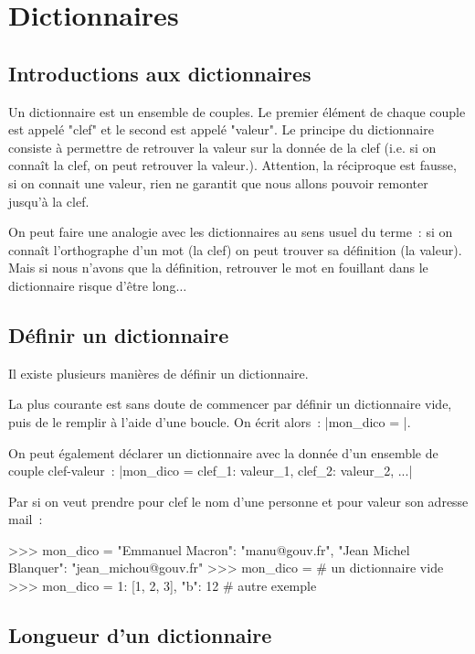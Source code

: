 \section{Dictionnaires}
	
	\subsection{Introductions aux dictionnaires}
		
		Un dictionnaire est un ensemble de couples. Le premier élément de chaque couple est appelé "clef" et le second est appelé "valeur".
		Le principe du dictionnaire consiste à permettre de retrouver la valeur sur la donnée de la clef (i.e. si on connaît la clef, on peut retrouver la valeur.). Attention, la réciproque est fausse, si on connait une valeur, rien ne garantit que nous allons pouvoir remonter jusqu'à la clef.
		
		On peut faire une analogie avec les dictionnaires au sens usuel du terme~: si on connaît l'orthographe d'un mot (la clef) on peut trouver sa définition (la valeur).
		Mais si nous n'avons que la définition, retrouver le mot en fouillant dans le dictionnaire risque d'être long$\ldots$
		
	\subsection{Définir un dictionnaire}
		
		Il existe plusieurs manières de définir un dictionnaire.
		
		La plus courante est sans doute de commencer par définir un dictionnaire vide, puis de le remplir à l'aide d'une boucle. On écrit alors~: \python|mon_dico = {}|.
		
		On peut également déclarer un dictionnaire avec la donnée d'un ensemble de couple clef-valeur~: \python|mon_dico = {clef_1: valeur_1, clef_2: valeur_2, ...}|
		
		Par si on veut prendre pour clef le nom d'une personne et pour valeur son adresse mail~:
		\begin{pythoncode}
			>>> mon_dico = {"Emmanuel Macron": "manu@gouv.fr", "Jean Michel Blanquer": "jean_michou@gouv.fr"}
			>>> mon_dico = {} # un dictionnaire vide
			>>> mon_dico = {1: [1, 2, 3], "b": 12} # autre exemple
		\end{pythoncode}
	
	\subsection{Longueur d'un dictionnaire}
		
